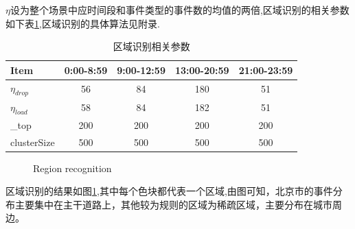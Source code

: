 $\eta$设为整个场景中应时间段和事件类型的事件数的均值的两倍,区域识别的相关参数如下表\ref{table_region_rec},区域识别的具体算法见附录.


\begin{table}
\caption{区域识别相关参数}\label{table_region_rec}
\centering
\begin{tabular}{l|c|c|c|c}
  \hline
  Item & 0:00-8:59 &9:00-12:59&13:00-20:59 &21:00-23:59 \\
  \hline
  $\eta_{drop}$ & 56&84 &180 &51\\
  $\eta_{load}$ & 58&84 &182 &51\\
  \_top & 200&200 &200 &200\\
  clusterSize& 500&500 &500 &500\\
  \hline
\end{tabular}
\end{table}


\begin{figure}[ht]
\centering
{}
\centering
\caption{Region recognition}\label{figure_region_recognizition}
\end{figure}

区域识别的结果如图\ref{figure_region_recognizition},其中每个色块都代表一个区域,由图可知，北京市的事件分布主要集中在主干道路上，其他较为规则的区域为稀疏区域，主要分布在城市周边。


